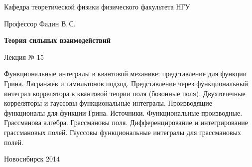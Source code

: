 \documentclass[12pt,pagesize,paper=192mm:108mm]{scrbook}
\begin{document}
\begin{titlepage}
\begin{center}
    Кафедра теоретической физики физического факультета НГУ
    \medskip

    \Large
    Профессор Фадин В.\,С.

    \huge
    \textbf{Теория сильных взаимодействий}
    \smallskip
    
    \Large
    Лекция № 15
    \vfill
    
    \normalsize
    \begin{minipage}{0.78\linewidth}
      Функциональные интегралы в квантовой механике: представление для
      функции Грина. Лагранжев и гамильтонов подход. Представление
      через функциональный интеграл коррелятора в квантовой теории
      поля (бозонные поля). Двухточечные корреляторы и гауссовы
      функциональные интегралы. Производящие функционалы для функции
      Грина. Источники. Функциональные производные. Грассманова
      алгебра. Грассмановы поля. Дифференцирование и интегрирование
      грассмановых полей. Гауссовы функциональные интегралы для
      грассмановых полей.
    \end{minipage}
    \vfill
    
    \normalsize \ccbysa\hspace{0.5em}  Новосибирск 2014   
  \end{center}
\end{titlepage}
\end{document}
